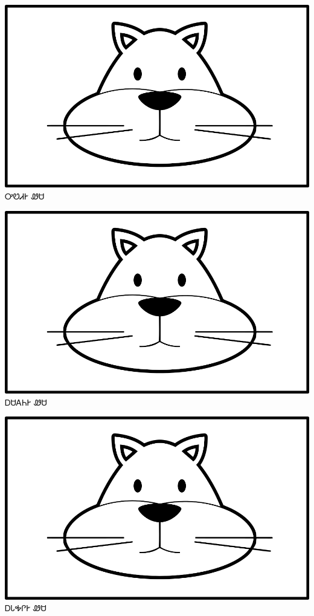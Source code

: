\documentclass[avery5371]{flashcards}%
\begin{document}
    \begin{flashcard}{
        \includegraphics[width=0.95\columnwidth,height=.51\columnwidth,keepaspectratio]{../artwork/for-colors/wesa}
    }
        \Huge ᎤᏬᏗᎨ ᏪᏌ
    \end{flashcard}

    \begin{flashcard}{
        \includegraphics[width=0.95\columnwidth,height=.51\columnwidth,keepaspectratio]{../artwork/for-colors/wesa}
    }
        \Huge ᎠᏌᎪᏂᎨ ᏪᏌ
    \end{flashcard}

    \begin{flashcard}{
        \includegraphics[width=0.95\columnwidth,height=.51\columnwidth,keepaspectratio]{../artwork/for-colors/wesa}
    }
        \Huge ᎠᏓᎭᎵᎨ ᏪᏌ
    \end{flashcard}
\end{document}
